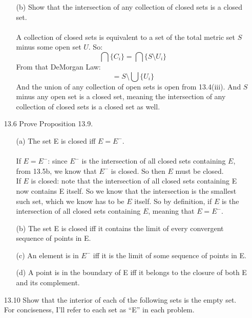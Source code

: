 \begin{itemize}
\begin{enumerate}
      \item [(b)] Show that the intersection of any collection of closed sets is a closed set.\\\\

        A collection of closed sets is equivalent to a set of the total metric set $S$ minus some open set $U$.
        So:
        $$\bigcap \{C_i \} = \bigcap \{S \setminus U_i \}$$
        From that DeMorgan Law:
        $$= S \setminus \bigcup \{U_i\}$$
        And the union of any collection of open sets is open from 13.4(iii). And $S$ minus any open set is a closed set, meaning the intersection of any collection of closed sets is a closed set as well.\\        
    \end{enumerate}
  \item [13.6]
    Prove Proposition 13.9.
    \begin{itemize}
      \item [(a)] The set E is closed iff $E = E^{-}$.\\\\

        If $E = E^{-}$: since $E^{-}$ is the intersection of all closed sets containing $E$, from 13.5b, we know that $E^{-}$ is closed. So then $E$ must be closed.\\

        If $E$ is closed: note that the intersection of all closed sets containing E now contains E itself. So we know that the intersection is the smallest such set, which we know has to be $E$ itself. So by definition, if $E$ is the intersection of all closed sets containing $E$, meaning that $E = E^{-}$.\\

      \item [(b)] The set E is closed iff it contains the limit of every convergent sequence of points in E.
      \item [(c)] An element is in $E^{-}$ iff it is the limit of some sequence of points in E.
      \item [(d)] A point is in the boundary of E iff it belongs to the closure of both E and its complement.
    \end{itemize}
  \item [13.10]
    Show that the interior of each of the following sets is the empty set.\\

    For conciseness, I'll refer to each set as ``E'' in each problem.
    \begin{itemize}


\end{itemize}
\end{itemize}
